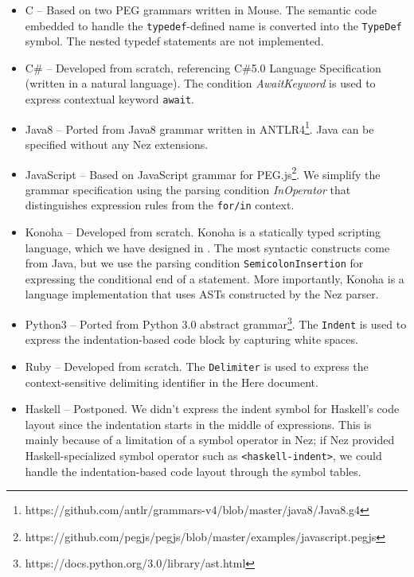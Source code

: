 \documentclass[preprint]{sigplanconf}
\begin{document}
\begin{itemize}

\item C -- Based on two PEG grammars written in Mouse. The semantic code embedded to handle the {\tt typedef}-defined name is converted into the {\tt TypeDef} symbol. The nested typedef statements are not implemented.

\item C\# -- Developed from scratch, referencing C\#5.0 Language Specification (written in a natural language). The condition {\it AwaitKeyword} is used to express contextual keyword {\tt await}. 

\item Java8 -- Ported from Java8 grammar written in ANTLR4\footnote{https://github.com/antlr/grammars-v4/blob/master/java8/Java8.g4}. Java can be specified without any Nez extensions. 

\item JavaScript -- Based on JavaScript grammar for PEG.js\footnote{https://github.com/pegjs/pegjs/blob/master/examples/javascript.pegjs}. We simplify the grammar specification using the parsing condition {\it InOperator} that distinguishes expression rules from the {\tt for/in} context. 

\item Konoha -- Developed from scratch. Konoha is a statically typed scripting language, which we have designed in \cite{Konoha}. The most syntactic constructs come from Java, but we use the parsing condition {\tt SemicolonInsertion} for expressing the conditional end of a statement. More importantly, Konoha is a language implementation that uses  ASTs constructed by the Nez parser.

\item Python3 -- Ported from Python 3.0 abstract grammar\footnote{https://docs.python.org/3.0/library/ast.html}. The {\tt Indent} is used to express the indentation-based code block by capturing white spaces.  

\item Ruby -- Developed from scratch. The {\tt Delimiter} is used to express the context-sensitive delimiting identifier in the Here document.

\item Haskell -- Postponed. We didn't express the indent symbol for Haskell's code layout since the indentation starts in the middle of expressions. This is mainly because of a limitation of a symbol operator in Nez; if Nez provided Haskell-specialized symbol operator such as \verb|<haskell-indent>|, we could handle the indentation-based code layout through the symbol tables. 

\end{itemize}
\end{document}
